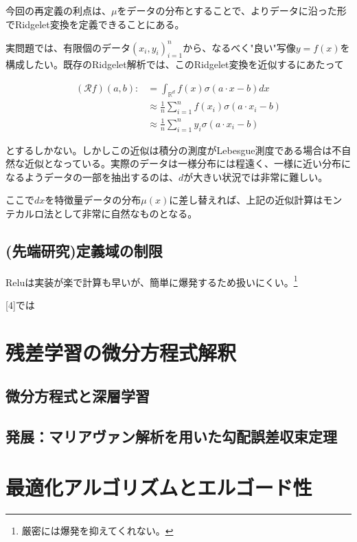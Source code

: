 \documentclass{jsarticle}
\begin{document}
今回の再定義の利点は、$\mu$をデータの分布とすることで、よりデータに沿った形でRidgelet変換を定義できることにある。

実問題では、有限個のデータ$(x_i,y_i)^n_{i=1}$から、なるべく"良い"写像$y=f(x)$を構成したい。既存のRidgelet解析では、このRidgelet変換を近似するにあたって

\begin{align}
(\mathcal{R} f)(a,b):&=\int_{\mathbb{R}^d} f(x)\sigma(a\cdot x-b)dx\\
&\approx \frac{1}{n}\sum^n_{i=1} f(x_i)\sigma(a\cdot x_i-b)\\
&\approx \frac{1}{n}\sum^n_{i=1} y_i\sigma(a\cdot x_i-b)
\end{align}

とするしかない。しかしこの近似は積分の測度がLebesgue測度である場合は不自然な近似となっている。実際のデータは一様分布には程遠く、一様に近い分布になるようデータの一部を抽出するのは、$d$が大きい状況では非常に難しい。

ここで$dx$を特徴量データの分布$\mu(x)$に差し替えれば、上記の近似計算はモンテカルロ法として非常に自然なものとなる。



\subsection{(先端研究)定義域の制限}

Reluは実装が楽で計算も早いが、簡単に爆発するため扱いにくい。\footnote{厳密には爆発を抑えてくれない。}

[4]では



\newpage

\section{残差学習の微分方程式解釈}

\subsection{微分方程式と深層学習}


\subsection{発展：マリアヴァン解析を用いた勾配誤差収束定理}


\newpage
\section{最適化アルゴリズムとエルゴード性}
\end{document}
